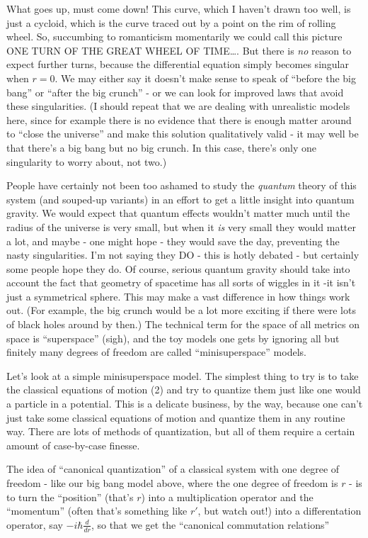 \documentclass{article}
\begin{document}
What goes up, must come down! This curve, which I haven't drawn too
well, is just a cycloid, which is the curve traced out by a point on the
rim of rolling wheel. So, succumbing to romanticism momentarily we could
call this picture ONE TURN OF THE GREAT WHEEL OF TIME\ldots. But there
is \emph{no} reason to expect further turns, because the differential
equation simply becomes singular when \(r = 0\). We may either say it
doesn't make sense to speak of ``before the big bang'' or ``after the
big crunch'' - or we can look for improved laws that avoid these
singularities. (I should repeat that we are dealing with unrealistic
models here, since for example there is no evidence that there is enough
matter around to ``close the universe'' and make this solution
qualitatively valid - it may well be that there's a big bang but no big
crunch. In this case, there's only one singularity to worry about, not
two.)

People have certainly not been too ashamed to study the \emph{quantum}
theory of this system (and souped-up variants) in an effort to get a
little insight into quantum gravity. We would expect that quantum
effects wouldn't matter much until the radius of the universe is very
small, but when it \emph{is} very small they would matter a lot, and
maybe - one might hope - they would save the day, preventing the nasty
singularities. I'm not saying they DO - this is hotly debated - but
certainly some people hope they do. Of course, serious quantum gravity
should take into account the fact that geometry of spacetime has all
sorts of wiggles in it -it isn't just a symmetrical sphere. This may
make a vast difference in how things work out. (For example, the big
crunch would be a lot more exciting if there were lots of black holes
around by then.) The technical term for the space of all metrics on
space is ``superspace'' (sigh), and the toy models one gets by ignoring
all but finitely many degrees of freedom are called ``minisuperspace''
models.

Let's look at a simple minisuperspace model. The simplest thing to try
is to take the classical equations of motion (2) and try to quantize
them just like one would a particle in a potential. This is a delicate
business, by the way, because one can't just take some classical
equations of motion and quantize them in any routine way. There are lots
of methods of quantization, but all of them require a certain amount of
case-by-case finesse.

The idea of ``canonical quantization'' of a classical system with one
degree of freedom - like our big bang model above, where the one degree
of freedom is \(r\) - is to turn the ``position'' (that's \(r\)) into a
multiplication operator and the ``momentum'' (often that's something
like \(r'\), but watch out!) into a differentation operator, say
\(-i \hbar \frac{d}{dr}\), so that we get the ``canonical commutation
relations''
\end{document}
